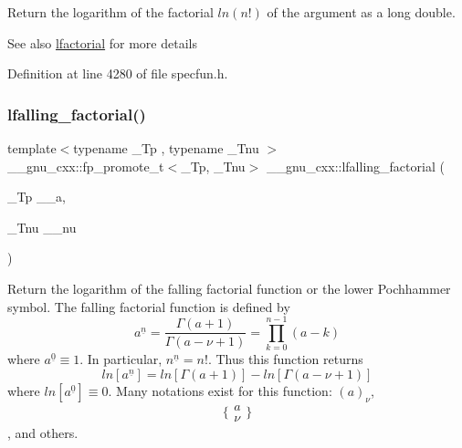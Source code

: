 Return the logarithm of the factorial $ ln(n!) $ of the argument as a {\ttfamily long double}.

\begin{DoxySeeAlso}{See also}
\hyperlink{group__mathsf__gnu_gab256f8d7b77b9a8fefafca21827166eb}{lfactorial} for more details 
\end{DoxySeeAlso}


Definition at line 4280 of file specfun.\+h.

\mbox{\label{group__mathsf__gnu_ga2032c10640d5010666d60d9faec86c32}} 
\subsubsection{\texorpdfstring{lfalling\+\_\+factorial()}{lfalling\_factorial()}}
{\footnotesize\ttfamily template$<$typename \+\_\+\+Tp , typename \+\_\+\+Tnu $>$ \\
\+\_\+\+\_\+gnu\+\_\+cxx\+::fp\+\_\+promote\+\_\+t$<$\+\_\+\+Tp, \+\_\+\+Tnu$>$ \+\_\+\+\_\+gnu\+\_\+cxx\+::lfalling\+\_\+factorial (\begin{DoxyParamCaption}\item[{\+\_\+\+Tp}]{\+\_\+\+\_\+a,  }\item[{\+\_\+\+Tnu}]{\+\_\+\+\_\+nu }\end{DoxyParamCaption})\hspace{0.3cm}{\ttfamily [inline]}}



Return the logarithm of the falling factorial function or the lower Pochhammer symbol. The falling factorial function is defined by \[ a^{\underline{n}} = \frac{\Gamma(a + 1)}{\Gamma(a - \nu + 1)} = \prod_{k=0}^{n-1} (a - k) \] where $ a^{\underline{0}} \equiv 1 $. In particular, $ n^{\underline{n}} = n! $. Thus this function returns \[ ln[a^{\underline{n}}] = ln[\Gamma(a + 1)] - ln[\Gamma(a - \nu + 1)] \] where $ ln[a^{\underline{0}}] \equiv 0 $. Many notations exist for this function\+: $ (a)_\nu $, \[ \{ \begin{array}{c} a \\ \nu \end{array} \} \], and others. 



